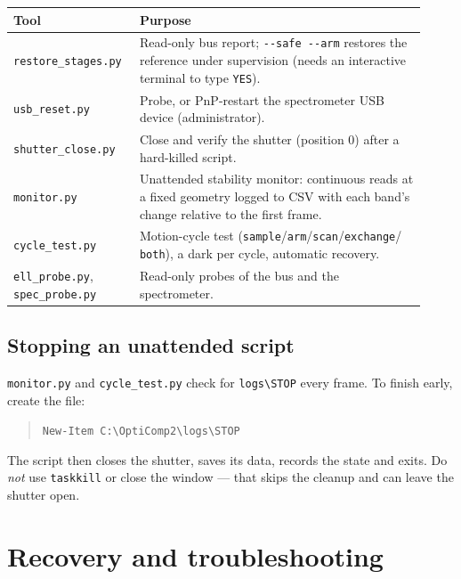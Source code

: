 \documentclass[11pt]{article}
\newcommand{\code}[1]{\texttt{\small #1}}
\begin{document}
\begin{center}
\begin{tabular}{>{\raggedright\arraybackslash}p{0.26\linewidth} >{\raggedright\arraybackslash}p{0.66\linewidth}}
\toprule
\textbf{Tool} & \textbf{Purpose} \\
\midrule
\code{restore\_stages.py} & Read-only bus report; \code{-{}-safe -{}-arm} restores the reference under
supervision (needs an interactive terminal to type \code{YES}). \\
\code{usb\_reset.py} & Probe, or PnP-restart the spectrometer USB device (administrator). \\
\code{shutter\_close.py} & Close and verify the shutter (position 0) after a hard-killed script. \\
\code{monitor.py} & Unattended stability monitor: continuous reads at a fixed geometry logged to CSV
with each band's change relative to the first frame. \\
\code{cycle\_test.py} & Motion-cycle test (\code{sample}/\code{arm}/\code{scan}/\code{exchange}/
\code{both}), a dark per cycle, automatic recovery. \\
\code{ell\_probe.py}, \code{spec\_probe.py} & Read-only probes of the bus and the spectrometer. \\
\bottomrule
\end{tabular}
\end{center}

\subsection*{Stopping an unattended script}
\code{monitor.py} and \code{cycle\_test.py} check for \code{logs\textbackslash STOP} every frame. To
finish early, create the file:
\begin{quote}\code{New-Item C:\textbackslash OptiComp2\textbackslash logs\textbackslash STOP}\end{quote}
The script then closes the shutter, saves its data, records the state and exits. Do \emph{not} use
\code{taskkill} or close the window --- that skips the cleanup and can leave the shutter open.

\section{Recovery and troubleshooting}
\end{document}
